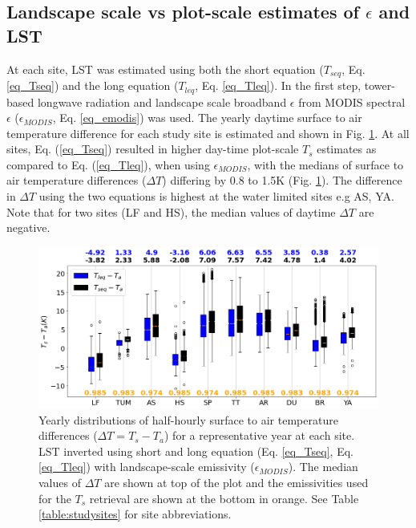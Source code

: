 \documentclass[fleqn,10pt]{wlscirep}
\begin{document}
\subsection{Landscape scale vs plot-scale estimates of $\epsilon$ and LST}
At each site, LST was estimated using both the short equation ($T_{seq}$, Eq. \ref{eq_Tseq}) and the long equation ($T_{leq}$, Eq. \ref{eq_Tleq}). In the first step, tower-based longwave radiation and landscape scale broadband $\epsilon$ from MODIS spectral $\epsilon$ ($\epsilon_{MODIS}$, Eq. \ref{eq_emodis}) was used. The yearly daytime surface to air temperature difference for each study site is estimated and shown in Fig. \ref{fig:long_short_eq_epsilon_MODIS}. At all sites, Eq. (\ref{eq_Tseq}) resulted in higher day-time plot-scale $T_{s}$ estimates as compared to Eq. (\ref{eq_Tleq}), when using $\epsilon_{MODIS}$, with the medians of surface to air temperature differences ($\Delta T$) differing by 0.8 to 1.5K (Fig. \ref{fig:long_short_eq_epsilon_MODIS}). The difference in $\Delta T$ using the two equations is highest at the water limited sites e.g AS, YA. Note that for two sites (LF and HS), the median values of daytime $\Delta T$ are negative.
\begin{figure}[h!]
	\includegraphics[scale=0.35]{Ts_Talocalleqseq.png}
	\centering
    \caption{
     Yearly distributions of half-hourly surface to air temperature differences ($\Delta T = T_s - T_a$) for a representative year at each site.  %
    LST inverted using short and long equation (Eq. \ref{eq_Tseq}, Eq. \ref{eq_Tleq}) with landscape-scale emissivity ($\epsilon_{MODIS}$).
    The median values of $\Delta T$ are shown at top of the plot and the emissivities used for the $T_{s}$ retrieval are shown at the bottom in orange. See Table \ref{table:studysites} for site abbreviations.}
	\label{fig:long_short_eq_epsilon_MODIS}
\end{figure}
\end{document}
